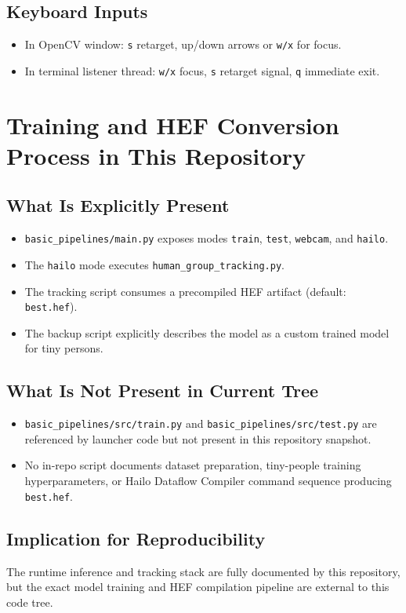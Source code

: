 \documentclass[11pt,a4paper]{article}
\begin{document}
\subsection{Keyboard Inputs}
\begin{itemize}[leftmargin=*]
  \item In OpenCV window: \texttt{s} retarget, up/down arrows or \texttt{w/x} for focus.
  \item In terminal listener thread: \texttt{w/x} focus, \texttt{s} retarget signal, \texttt{q} immediate exit.
\end{itemize}

\section{Training and HEF Conversion Process in This Repository}
\subsection{What Is Explicitly Present}
\begin{itemize}[leftmargin=*]
  \item \texttt{basic\_pipelines/main.py} exposes modes \texttt{train}, \texttt{test}, \texttt{webcam}, and \texttt{hailo}.
  \item The \texttt{hailo} mode executes \texttt{human\_group\_tracking.py}.
  \item The tracking script consumes a precompiled HEF artifact (default: \texttt{best.hef}).
  \item The backup script explicitly describes the model as a custom trained model for tiny persons.
\end{itemize}

\subsection{What Is Not Present in Current Tree}
\begin{itemize}[leftmargin=*]
  \item \texttt{basic\_pipelines/src/train.py} and \texttt{basic\_pipelines/src/test.py} are referenced by launcher code but not present in this repository snapshot.
  \item No in-repo script documents dataset preparation, tiny-people training hyperparameters, or Hailo Dataflow Compiler command sequence producing \texttt{best.hef}.
\end{itemize}

\subsection{Implication for Reproducibility}
The runtime inference and tracking stack are fully documented by this repository, but the exact model training and HEF compilation pipeline are external to this code tree.
\end{document}
